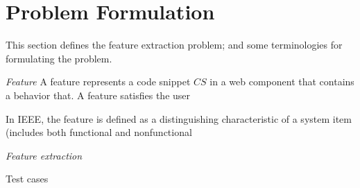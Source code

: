 
\section{Problem Formulation}
This section defines the feature extraction problem; and some terminologies for formulating the problem.

\emph{Feature}
A feature represents a code snippet $CS$ in a web component that contains a behavior that.
A feature satisfies the user

In IEEE, the feature is defined as a distinguishing characteristic of a system item (includes both functional and nonfunctional

\emph{Feature extraction}

Test cases
